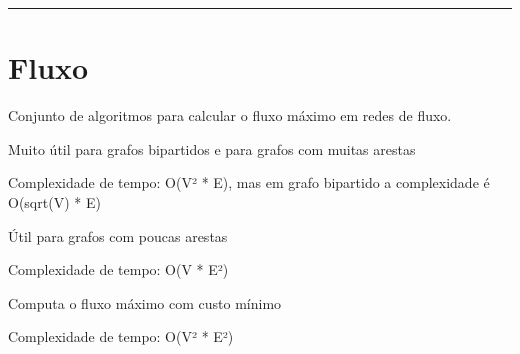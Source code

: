 \documentclass[11pt, a4paper, twoside]{book}
\begin{document}
\hfill

\rule{\textwidth}{0.4pt}

\section{Fluxo}



Conjunto de algoritmos para calcular o fluxo máximo em redes de fluxo.



\textbf{} 


Muito útil para grafos bipartidos e para grafos com muitas arestas



Complexidade de tempo: O(V² * E), mas em grafo bipartido a complexidade é O(sqrt(V) * E)



\textbf{} 


Útil para grafos com poucas arestas



Complexidade de tempo: O(V * E²)



\textbf{} 


Computa o fluxo máximo com custo mínimo



Complexidade de tempo: O(V² * E²)


\hfill
\end{document}
